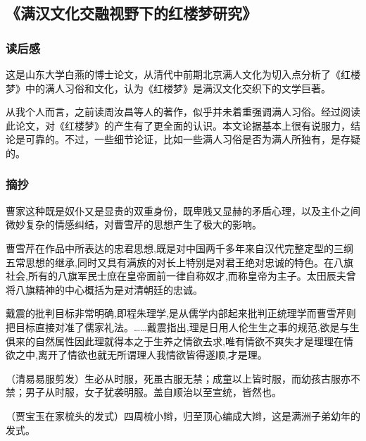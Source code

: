 \subsection{《满汉文化交融视野下的红楼梦研究》}

\subsubsection{读后感}
这是山东大学白燕的博士论文，从清代中前期北京满人文化为切入点分析了《红楼梦》中的满人习俗和文化，认为《红楼梦》是满汉文化交织下的文学巨著。 

从我个人而言，之前读周汝昌等人的著作，似乎并未着重强调满人习俗。经过阅读此论文，对《红楼梦》的产生有了更全面的认识。本文论据基本上很有说服力，结论是可靠的。不过，一些细节论证，比如一些满人习俗是否为满人所独有，是存疑的。

\subsubsection{摘抄}
曹家这种既是奴仆又是显贵的双重身份，既卑贱又显赫的矛盾心理，以及主仆之间微妙复杂的情感纠结，对曹雪芹的思想产生了极大的影响。 

曹雪芹在作品中所表达的忠君思想,既是对中国两千多年来自汉代完整定型的三纲五常思想的继承,同时又具有满族的对长上特别是对君王绝对忠诚的特色。在八旗社会,所有的八旗军民士庶在皇帝面前一律自称奴才,而称皇帝为主子。太田辰夫曾将八旗精神的中心概括为是对清朝廷的忠诚。 

戴震的批判目标非常明确,即程朱理学,是从儒学内部起来批判正统理学而曹雪芹则把目标直接对准了儒家礼法。……戴震指出,理是日用人伦生生之事的规范,欲是与生俱来的自然属性因此理就得本之于生养之情欲去求,唯有情欲不爽失才是理理在情欲之中,离开了情欲也就无所谓理人我情欲皆得遂顺,才是理。 

（清易易服剪发）生必从时服，死虽古服无禁；成童以上皆时服，而幼孩古服亦不禁；男子从时服，女子犹袭明服。盖自顺治以至宣统，皆然也。 

（贾宝玉在家梳头的发式）四周梳小辫，归至顶心编成大辫，这是满洲子弟幼年的发式。 

